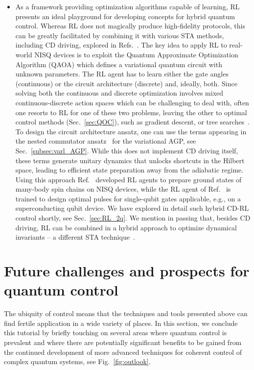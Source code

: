 \begin{itemize}
\item As a framework providing optimization algorithms capable of learning, RL presents an ideal playground for developing concepts for hybrid quantum control. Whereas RL does not magically produce high-fidelity protocols, this can be greatly facilitated by combining it with various STA methods, including CD driving, explored in Refs.~\cite{yao2021reinforcement,XiChenRL1}. The key idea to apply RL to real-world NISQ devices is to exploit the Quantum Approximate Optimization Algorithm (QAOA) which defines a variational quantum circuit with unknown parameters. The RL agent has to learn either the gate angles (continuous) or the circuit architecture (discrete) and, ideally, both. Since solving both the continuous and discrete optimization involves mixed continuous-discrete action spaces which can be challenging to deal with, often one resorts to RL for one of these two problems, leaving the other to optimal control methods (Sec.~\ref{sec:QOC}), such as gradient descent, or tree searches~\cite{yao2022monte}. To design the circuit architecture ansatz, one can use the terms appearing in the nested commutator ansatz~\cite{Claeys2019Floquet} for the variational AGP, see Sec.~\ref{subsec:varl_AGP}. While this does not implement CD driving itself, these terms generate unitary dynamics that unlocks shortcuts in the Hilbert space, leading to efficient state preparation away from the adiabatic regime. 
Using this approach Ref.~\cite{yao2021reinforcement} developed RL agents to prepare ground states of many-body spin chains on NISQ devices, while the RL agent of Ref.~\cite{XiChenRL1} is trained to design optimal pulses for single-qubit gates applicable, e.g., on a superconducting qubit device. 
We have explored in detail such hybrid CD-RL control shortly, see Sec.~\ref{sec:RL_2q}.
We mention in passing that, besides CD driving, RL can be combined in a hybrid approach to optimize dynamical invariants -- a different STA technique~\cite{XiChenRL3}.
\end{itemize}

\clearpage

\section{Future challenges and prospects for quantum control}
\label{sec:Outlook}

The ubiquity of control means that the techniques and tools presented above can find fertile application in a wide variety of places. In this section, we conclude this tutorial by briefly touching on several areas where quantum control is prevalent and where there are potentially significant benefits to be gained from the continued development of more advanced techniques for coherent control of complex quantum systems, see Fig.~\ref{fig:outlook}.\\

